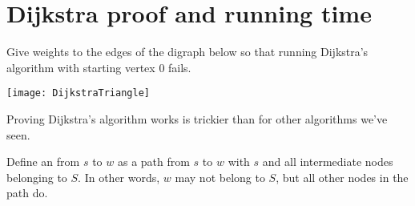\chapter{Dijkstra proof and running time} %
\begin{Boxample}[0.5] \label{ex:dijk-neg-fails}
Give weights to the edges of the digraph below so that running Dijkstra's algorithm 
with starting vertex $0$ fails. 
\vspace{0.5cm} 
\begin{center}
  \texttt{[image: DijkstraTriangle]}
\end{center}
\end{Boxample}

Proving Dijkstra's algorithm works is trickier than for other algorithms we've seen.

Define an  from $s$ to $w$ as a
path from $s$ to $w$ with $s$ and all intermediate nodes belonging to $S$. 
In other words, $w$ may not belong to $S$, but all other nodes in the path do.

